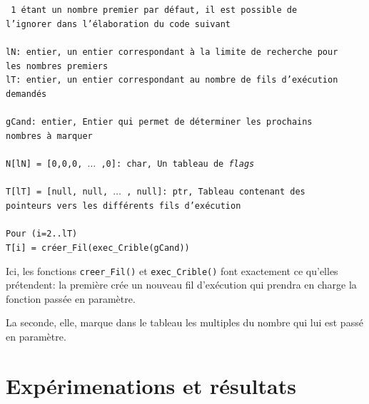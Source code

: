 \documentclass{report}
\def\code#1{\texttt{#1}} %
\def\comment#1{\color{gray} #1 \color{black}}
\begin{document}
		\noindent
		\code{
			\comment{
			1 étant un nombre premier par défaut, il est possible de \\l'ignorer
			dans l'élaboration du code suivant
			} \\
			\\
			lN: entier, \comment{un entier correspondant à la limite de recherche
			pour \\les nombres premiers}\\
			lT: entier, \comment{un entier correspondant au nombre de fils
			d'exécution \\demandés} \\
			\\
			gCand: entier, \comment{Entier qui permet de déterminer les prochains
			\\nombres à marquer} \\
			\\
			N[lN] = [0,0,0, $\ldots$ ,0]: char, \comment{Un tableau de {\it flags}} \\
			\\
			T[lT] = [null, null, $\ldots$ , null]: ptr, \comment{Tableau contenant
			des \\pointeurs vers les différents fils d'exécution} \\
			\\
			Pour (i=2..lT) \\
			\hspace*{16pt} T[i] = créer\_Fil(exec\_Crible(gCand))
		}

		\bigskip
		Ici, les fonctions \code{creer\_Fil()} et \code{exec\_Crible()}
		font exactement ce qu'elles prétendent: la première crée un nouveau fil
		d'exécution qui prendra en charge la fonction passée en paramètre.

		\smallskip
		La seconde, elle, marque dans le tableau les multiples du nombre qui
		lui est passé en paramètre.


\chapter{Expérimenations et résultats}
\end{document}
